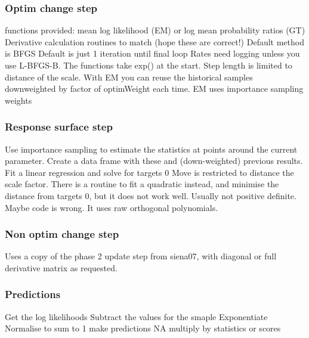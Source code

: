 \documentclass[12pt, a4paper]{article}
\renewcommand{\=}{\,=\,}
\newcommand{\+}{\,+\,}
\begin{document}
\subsubsection{Optim change step}
\label{sec:optim}
\begin{algorithmic}
 functions provided: mean log likelihood (EM) or log mean
probability ratios (GT)
\STATE Derivative calculation routines to match (hope these are correct!)
\STATE Default method is BFGS
\STATE Default is just 1 iteration until final loop
\STATE Rates need logging unless you use L-BFGS-B. The functions take exp() at
the start.
\STATE Step length is limited to distance of the scale.
\STATE With EM you can reuse the historical samples downweighted by factor of
optimWeight each time.
\STATE EM uses importance sampling weights
\end{algorithmic}
\subsubsection{Response surface step}
\label{sec:resp}
\begin{algorithmic}
\STATE Use importance sampling to estimate the statistics at points around the
current parameter.
\STATE Create a data frame with these and (down-weighted) previous results.
\STATE Fit a linear regression and solve for targets 0
\STATE Move is restricted to distance the scale factor.
\STATE There is a routine to fit a quadratic instead, and minimise the distance
from targets 0, but it does not work well. Usually not positive definite. Maybe
code is wrong. It uses raw orthogonal polynomials.
\end{algorithmic}
\subsubsection{Non optim change step}
\label{sec:algchange}
\begin{algorithmic}
\STATE Uses a copy of the phase 2 update step from siena07, with diagonal or full
derivative matrix as requested.
\end{algorithmic}
\subsubsection{Predictions}
\label{sec:pred}
\begin{algorithmic}
\STATE Get the log likelihoods
\STATE Subtract the values for the smaple
\STATE Exponentiate
\STATE Normalise to sum to 1
\STATE make predictions NA
\ELSE
\STATE multiply by statistics or scores
\ENDIF
\end{algorithmic}
\end{document}
